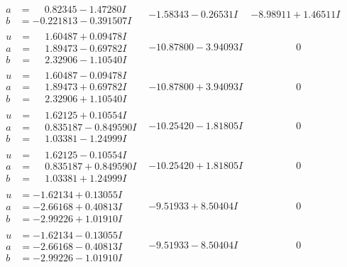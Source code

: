 \documentclass[1p]{elsarticle_modified}
\theoremstyle{definition}
\begin{document}
$$\begin{array}{c|c|c}
\begin{aligned}
a &= \phantom{-}0.82345 - 1.47280 I \\
b &= -0.221813 - 0.391507 I\end{aligned}
 & -1.58343 - 0.26531 I & -8.98911 + 1.46511 I \\ \hline\begin{aligned}
u &= \phantom{-}1.60487 + 0.09478 I \\
a &= \phantom{-}1.89473 - 0.69782 I \\
b &= \phantom{-}2.32906 - 1.10540 I\end{aligned}
 & -10.87800 - 3.94093 I & \phantom{-0.000000 } 0 \\ \hline\begin{aligned}
u &= \phantom{-}1.60487 - 0.09478 I \\
a &= \phantom{-}1.89473 + 0.69782 I \\
b &= \phantom{-}2.32906 + 1.10540 I\end{aligned}
 & -10.87800 + 3.94093 I & \phantom{-0.000000 } 0 \\ \hline\begin{aligned}
u &= \phantom{-}1.62125 + 0.10554 I \\
a &= \phantom{-}0.835187 - 0.849590 I \\
b &= \phantom{-}1.03381 - 1.24999 I\end{aligned}
 & -10.25420 - 1.81805 I & \phantom{-0.000000 } 0 \\ \hline\begin{aligned}
u &= \phantom{-}1.62125 - 0.10554 I \\
a &= \phantom{-}0.835187 + 0.849590 I \\
b &= \phantom{-}1.03381 + 1.24999 I\end{aligned}
 & -10.25420 + 1.81805 I & \phantom{-0.000000 } 0 \\ \hline\begin{aligned}
u &= -1.62134 + 0.13055 I \\
a &= -2.66168 + 0.40813 I \\
b &= -2.99226 + 1.01910 I\end{aligned}
 & -9.51933 + 8.50404 I & \phantom{-0.000000 } 0 \\ \hline\begin{aligned}
u &= -1.62134 - 0.13055 I \\
a &= -2.66168 - 0.40813 I \\
b &= -2.99226 - 1.01910 I\end{aligned}
 & -9.51933 - 8.50404 I & \phantom{-0.000000 } 0 \\ \hline\begin{aligned}

\end{aligned}
\end{array}$$
\end{document}

